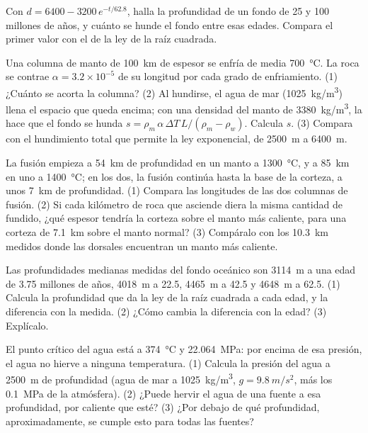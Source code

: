 \begin{exercise}[$\star\star$]\label{exo:g11:ocean-ridges:11}
Con $d = 6400 - 3200\,e^{-t/62.8}$, halla la profundidad de un fondo de 25 y
100 millones de años, y cuánto se hunde el fondo entre esas edades. Compara el
primer valor con el de la ley de la raíz cuadrada.
\end{exercise}

\begin{exercise}[$\star\star\star$]\label{exo:g11:ocean-ridges:12}
Una columna de manto de \qty{100}{km} de espesor se enfría de media
\qty{700}{\celsius}. La roca se contrae $\alpha = 3.2 \times 10^{-5}$ de su
longitud por cada grado de enfriamiento. (1) ¿Cuánto se acorta la columna?
(2) Al hundirse, el agua de mar (\qty{1025}{kg/m^3}) llena el espacio que
queda encima; con una densidad del manto de \qty{3380}{kg/m^3}, la 
hace que el fondo se hunda
$s = \rho_m\,\alpha\,\Delta T\,L/(\rho_m - \rho_w)$. Calcula $s$. (3) Compara
con el hundimiento total que permite la ley exponencial, de \qty{2500}{m} a
\qty{6400}{m}.
\end{exercise}

\begin{exercise}[$\star\star\star$]\label{exo:g11:ocean-ridges:13}
La fusión empieza a \qty{54}{km} de profundidad en un manto a
\qty{1300}{\celsius}, y a \qty{85}{km} en uno a \qty{1400}{\celsius}; en los
dos, la fusión continúa hasta la base de la corteza, a unos \qty{7}{km} de
profundidad. (1) Compara las longitudes de las dos columnas de fusión. (2) Si
cada kilómetro de roca que asciende diera la misma cantidad de fundido, ¿qué
espesor tendría la corteza sobre el manto más caliente, para una corteza de
\qty{7.1}{km} sobre el manto normal? (3) Compáralo con los \qty{10.3}{km}
medidos donde las dorsales encuentran un manto más caliente.
\end{exercise}

\begin{exercise}[$\star\star\star$]\label{exo:g11:ocean-ridges:14}
Las profundidades medianas medidas del fondo oceánico son \qty{3114}{m} a una
edad de \num{3.75} millones de años, \qty{4018}{m} a \num{22.5}, \qty{4465}{m}
a \num{42.5} y \qty{4648}{m} a \num{62.5}. (1) Calcula la profundidad que da
la ley de la raíz cuadrada a cada edad, y la diferencia con la medida. (2)
¿Cómo cambia la diferencia con la edad? (3) Explícalo.
\end{exercise}

\begin{exercise}[$\star\star\star$]\label{exo:g11:ocean-ridges:15}
El punto crítico del agua está a \qty{374}{\celsius} y \qty{22.064}{MPa}: por
encima de esa presión, el agua no hierve a ninguna temperatura. (1) Calcula la
presión del agua a \qty{2500}{m} de profundidad (agua de mar a
\qty{1025}{kg/m^3}, $g = \qty{9.8}{m/s^2}$, más los \qty{0.1}{MPa} de la
atmósfera). (2) ¿Puede hervir el agua de una fuente a esa profundidad, por
caliente que esté? (3) ¿Por debajo de qué profundidad, aproximadamente, se
cumple esto para todas las fuentes?
\end{exercise}

